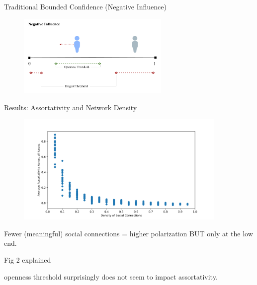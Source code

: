 \documentclass[12pt]{beamer}
\begin{document}
\begin{frame}[c]{\normalsize Traditional Bounded Confidence (Negative Influence)}  %


\begin{figure}
	\includegraphics[width=0.65\textwidth]{images/BCNegativeInfluence.png}
\end{figure}


\end{frame}


\begin{frame}[c]{Results: Assortativity and Network Density}  %

\begin{figure}
	\includegraphics[width=0.9\textwidth]{images/Assort_edge.png}

\end{figure}

\vspace{-.3in}
\small
Fewer (meaningful) social connections = higher polarization BUT only at the low end.

\end{frame}

\begin{frame}[c]{Fig 2 explained}  %


openness threshold surprisingly does not seem to impact assortativity.

\end{frame}
\end{document}
